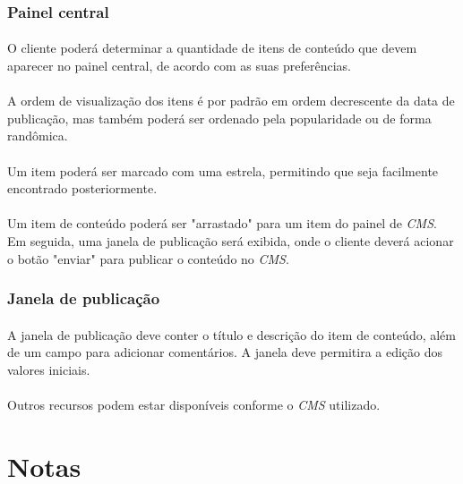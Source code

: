\documentclass[a4paper,12pt]{article}
\def\cms{\emph{CMS}}
\begin{document}
\subsubsection{Painel central}

\paragraph{}
O cliente poderá determinar a quantidade de itens de conteúdo que devem aparecer no painel central, de acordo com as suas preferências.
\paragraph{}
A ordem de visualização dos itens é por padrão em ordem decrescente da data de publicação, mas também poderá ser ordenado pela popularidade ou de forma randômica.
\paragraph{}
Um item poderá ser marcado com uma estrela, permitindo que seja facilmente encontrado posteriormente.
\paragraph{}
Um item de conteúdo poderá ser "arrastado" para um item do painel de \cms{}. Em seguida, uma janela de publicação será exibida, onde o cliente deverá acionar o botão "enviar" para publicar o conteúdo no \cms{}.

\subsubsection{Janela de publicação}
\paragraph{}
A janela de publicação deve conter o título e descrição do item de conteúdo, além de um campo para adicionar comentários. A janela deve permitira a edição dos valores iniciais.
\paragraph{}
Outros recursos podem estar disponíveis conforme o \cms{} utilizado.

\section{Notas}
\end{document}
